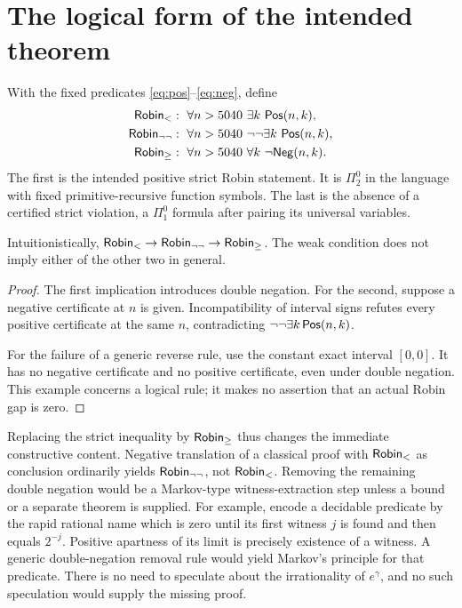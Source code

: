 \section{The logical form of the intended theorem}
\label{sec:logic}

With the fixed predicates \eqref{eq:pos}--\eqref{eq:neg}, define
\begin{align*}
 \mathsf{Robin}_{<}&:\ \forall n>5040\ \exists k\ \mathsf{Pos}(n,k),\\
 \mathsf{Robin}_{\neg\neg}&:\ \forall n>5040\ \neg\neg\exists k\ \mathsf{Pos}(n,k),\\
 \mathsf{Robin}_{\geq}&:\ \forall n>5040\ \forall k\ \neg\mathsf{Neg}(n,k).
\end{align*}
The first is the intended positive strict Robin statement. It is
$\Pi^0_2$ in the language with fixed primitive-recursive function
symbols. The last is the absence of a certified strict violation,
a $\Pi^0_1$ formula after pairing its universal variables.

\begin{proposition}\label{prop:logic}
Intuitionistically, $\mathsf{Robin}_{<}\to\mathsf{Robin}_{\neg\neg}\to\mathsf{Robin}_{\geq}$.
The weak condition does not imply either of the other two in general.
\end{proposition}
\begin{proof}
The first implication introduces double negation. For the second,
suppose a negative certificate at $n$ is given. Incompatibility of
interval signs refutes every positive certificate at the same $n$,
contradicting $\neg\neg\exists k\,\mathsf{Pos}(n,k)$.

For the failure of a generic reverse rule, use the constant exact
interval $[0,0]$. It has no negative certificate and no positive
certificate, even under double negation. This example concerns a
logical rule; it makes no assertion that an actual Robin gap is zero.
\end{proof}

Replacing the strict inequality by $\mathsf{Robin}_{\geq}$ thus changes the immediate
constructive content. Negative translation of a classical proof with
$\mathsf{Robin}_{<}$ as conclusion ordinarily yields $\mathsf{Robin}_{\neg\neg}$, not $\mathsf{Robin}_{<}$.
Removing the remaining double negation would be a Markov-type
witness-extraction step unless a bound or a separate theorem is supplied.
For example, encode a decidable predicate by the rapid rational name
which is zero until its first witness $j$ is found and then equals
$2^{-j}$. Positive apartness of its limit is precisely existence of a
witness. A generic double-negation removal rule would yield Markov's
principle for that predicate.
There is no need to speculate about the irrationality of $e^\gamma$,
and no such speculation would supply the missing proof.

